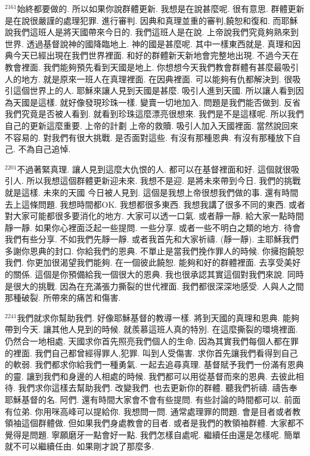 \documentclass{book}
\begin{document}
$^{2161}$始終都要做的.
所以如果你說群體更新.
我想是在說甚麼呢.
很有意思.
群體更新是在說很嚴謹的處理犯罪.
進行審判.
因典和真理並重的審判,饒恕和復和.
而耶穌說我們這班人是將天國帶來今日的.
我們這班人是在說.
上帝說我們究竟夠熟來到世界.
透過基督說神的國降臨地上.
神的國是甚麼呢.
其中一樣東西就是.
真理和因典今天已經出現在我們世界裡面.
和好的群體新天新地會完整地出現.
不過今天在教會裡面.
我們能夠預先看到天國是地上.
你想想今天我們教會群體有甚麼最吸引人的地方.
就是原來一班人在真理裡面.
在因典裡面.
可以能夠有仇都解決到.
很吸引這個世界上的人.
耶穌來讓人見到天國是甚麼.
吸引人進到天國.
所以讓人看到因為天國是這樣.
就好像發現珍珠一樣.
變賣一切地加入.
問題是我們能否做到.
反省我們究竟是否被人看到.
就看到珍珠這麼漂亮很想來.
我們是不是這樣呢.
所以我們自己的更新這麼重要.
上帝的計劃 上帝的救贖.
吸引人加入天國裡面.
當然說回來不容易的.
對我們有很大挑戰.
是否面對這些.
有沒有那種恩典.
有沒有那種放下自己.
不為自己追悼.

$^{2201}$不過著緊真理.
讓人見到這麼大仇恨的人.
都可以在基督裡面和好.
這個就很吸引人.
所以我想這個群體更新迎未來.
我想不是迎.
是將未來帶到今日.
我們的挑戰就是這樣.
未來的天國 今日被人見到.
這個是我想上帝很想我們做的事.
還有時間去上這條問題.
我想時間都OK.
我想都很多東西.
我想我講了很多不同的東西.
或者對大家可能都很多要消化的地方.
大家可以透一口氣.
或者靜一靜.
給大家一點時間靜一靜.
如果你心裡面泛起一些提問.
一些分享.
或者一些不明白之類的地方.
待會我們有些分享.
不如我們先靜一靜.
或者我首先和大家祈禱.
(靜一靜).
主耶穌我們多謝你恩典的封口.
你給我們的恩典.
不單止是當我們挽作罪人的時候.
你擁抱饒恕我們.
你更加很渴望我們能夠.
在一個彼此饒恕.
能夠和好的群體裡面.
去享受美好的關係.
這個是你預備給我一個很大的恩典.
我也很承認其實這個對我們來說.
同時是很大的挑戰.
因為在充滿張力撕裂的世代裡面.
我們都很深深地感受.
人與人之間那種破裂.
所帶來的痛苦和傷害.

$^{2241}$我們就求你幫助我們.
好像耶穌基督的教導一樣.
將到天國的真理和恩典.
能夠帶到今天.
讓其他人見到的時候.
就羨慕這班人真的特別.
在這麼撕裂的環境裡面.
仍然合一地相處.
天國求你首先照亮我們個人的生命.
因為其實我們每個人都在罪的裡面.
我們自己都曾經得罪人,犯罪.
叫到人受傷害.
求你首先讓我們看得到自己的軟弱.
我們都求你給我們一種勇氣.
一起去追尋真理.
基督賦予我們一份滿有恩典的靈.
讓到我們和身邊的人相處的時候.
我們都可以用從基督而來的恩典.
去彼此相待.
我們求你這樣去幫助我們.
改變我們.
也去更新你的群體.
聽我們祈禱.
禱告奉耶穌基督的名.
阿們.
還有時間大家會不會有些提問.
有些討論的時間都可以.
前面有位弟.
你用咪高峰可以提給你.
我想問一問.
通常處理罪的問題.
會是目者或者教領袖這個群體做.
但如果我們身處教會的目者.
或者是我們的教領袖群體.
大家都不覺得是問題.
寧願磨牙一點會好一點.
我們怎樣自處呢.
繼續任由還是怎樣呢.
簡單就不可以繼續任由.
如果剛才說了那麼多.
\end{document}
